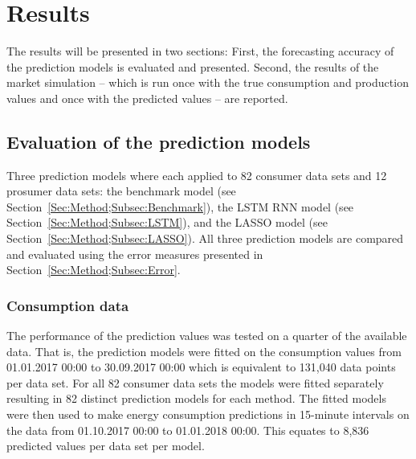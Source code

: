 
\section{Results}\label{Sec:Results}

The results will be presented in two sections: First, the forecasting accuracy of the prediction models is evaluated and presented. Second, the results of the market simulation -- which is run once with the true consumption and production values and once with the predicted values -- are reported.



\subsection{Evaluation of the prediction models}\label{Sec:Results;Subsec:Forecast}

Three prediction models where each applied to 82 consumer data sets and 12 prosumer data sets: the benchmark model (see Section~\ref{Sec:Method;Subsec:Benchmark}), the LSTM RNN model (see Section~\ref{Sec:Method;Subsec:LSTM}), and the LASSO model (see Section~\ref{Sec:Method;Subsec:LASSO}). All three prediction models are compared and evaluated using the error measures presented in Section~\ref{Sec:Method;Subsec:Error}.


\subsubsection{Consumption data}

The performance of the prediction values was tested on a quarter of the available data. That is, the prediction models were fitted on the consumption values from 01.01.2017 00:00 to 30.09.2017 00:00 which is equivalent to 131,040 data points per data set. For all 82 consumer data sets the models were fitted separately resulting in 82 distinct prediction models for each method. The fitted models were then used to make energy consumption predictions in 15-minute intervals on the data from 01.10.2017 00:00 to 01.01.2018 00:00. This equates to 8,836 predicted values per data set per model.

